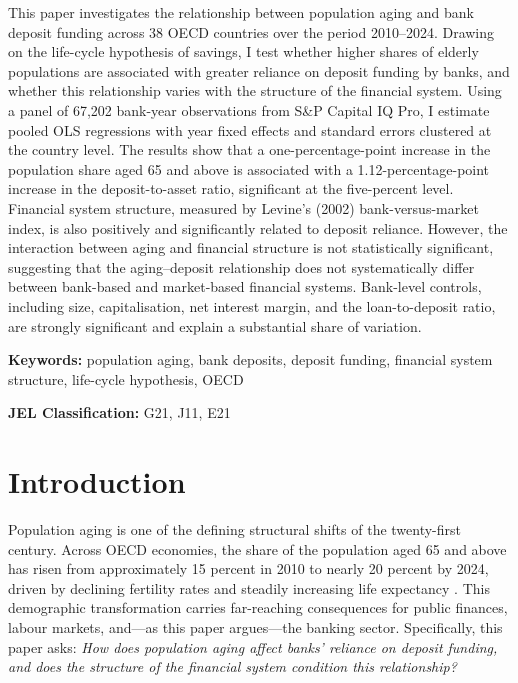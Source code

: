 \documentclass[12pt,a4paper]{article}
\begin{document}
This paper investigates the relationship between population aging and bank deposit funding across 38 OECD countries over the period 2010--2024. Drawing on the life-cycle hypothesis of savings, I test whether higher shares of elderly populations are associated with greater reliance on deposit funding by banks, and whether this relationship varies with the structure of the financial system. Using a panel of 67,202 bank-year observations from S\&P Capital IQ Pro, I estimate pooled OLS regressions with year fixed effects and standard errors clustered at the country level. The results show that a one-percentage-point increase in the population share aged 65 and above is associated with a 1.12-percentage-point increase in the deposit-to-asset ratio, significant at the five-percent level. Financial system structure, measured by Levine's (2002) bank-versus-market index, is also positively and significantly related to deposit reliance. However, the interaction between aging and financial structure is not statistically significant, suggesting that the aging--deposit relationship does not systematically differ between bank-based and market-based financial systems. Bank-level controls, including size, capitalisation, net interest margin, and the loan-to-deposit ratio, are strongly significant and explain a substantial share of variation.

\vspace{0.5cm}
\noindent\textbf{Keywords:} population aging, bank deposits, deposit funding, financial system structure, life-cycle hypothesis, OECD

\noindent\textbf{JEL Classification:} G21, J11, E21

\newpage


\tableofcontents
\newpage


\section{Introduction}
\label{sec:intro}

Population aging is one of the defining structural shifts of the twenty-first century. Across OECD economies, the share of the population aged 65 and above has risen from approximately 15 percent in 2010 to nearly 20 percent by 2024, driven by declining fertility rates and steadily increasing life expectancy \citep{OECD2024}. This demographic transformation carries far-reaching consequences for public finances, labour markets, and---as this paper argues---the banking sector. Specifically, this paper asks: \textit{How does population aging affect banks' reliance on deposit funding, and does the structure of the financial system condition this relationship?}
\end{document}
